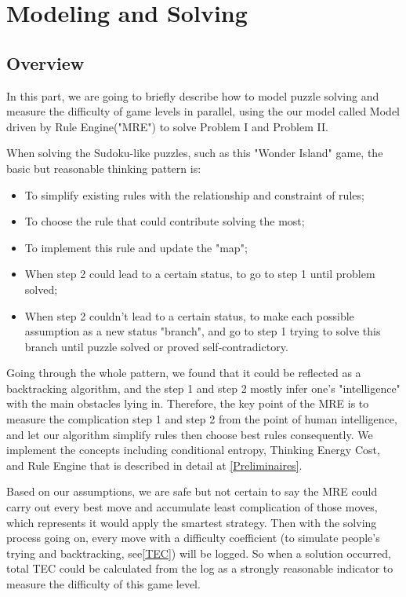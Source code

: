 \documentclass{article}
\begin{document}
\section{Modeling and Solving}

\subsection{Overview}\label{ModelOverview}

In this part, we are going to briefly describe how to model puzzle solving and measure the difficulty of game levels in parallel, using the our model called Model driven by Rule Engine("MRE") to solve Problem I and Problem II.

When solving the Sudoku-like puzzles, such as this "Wonder Island" game, the basic but reasonable thinking pattern is: 

\begin{itemize}
  \item To simplify existing rules with the relationship and constraint of rules;
  \item To choose the rule that could contribute solving the most;
  \item To implement this rule and update the "map";
  \item When step 2 could lead to a certain status, to go to step 1 until problem solved;
  \item When step 2 couldn't lead to a certain status, to make each possible assumption as a new status "branch", and go to step 1 trying to solve this branch until puzzle solved or proved self-contradictory.
\end{itemize}

Going through the whole pattern, we found that it could be reflected as a backtracking algorithm, and the step 1 and step 2 mostly infer one's "intelligence" with the main obstacles lying in. Therefore, the key point of the MRE is to measure the complication step 1 and step 2 from the point of human intelligence, and let our algorithm simplify rules then choose best rules consequently. We implement the concepts including conditional entropy, Thinking Energy Cost, and Rule Engine that is described in detail at \ref{Preliminaires}.

Based on our assumptions, we are safe but not certain to say the MRE could carry out every best move and accumulate least complication of those moves, which represents it would apply the smartest strategy. Then with the solving process going on, every move with a difficulty coefficient (to simulate people's trying and backtracking, see\ref{TEC}) will be logged. So when a solution occurred, total TEC could be calculated from the log as a strongly reasonable indicator to measure the difficulty of this game level. 
\end{document}
